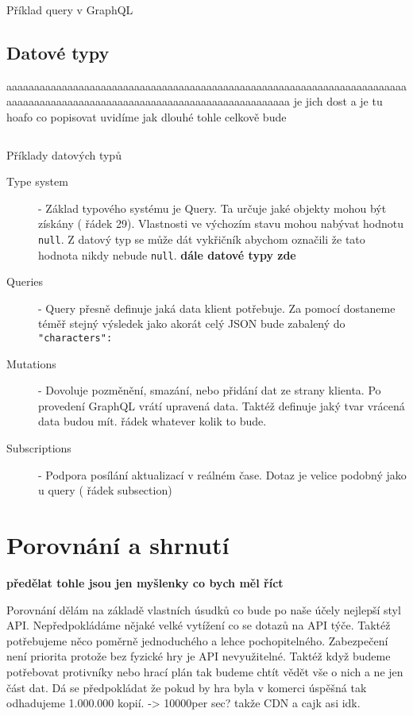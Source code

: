 \begin{listing}[ht!]
    \inputminted[]{graphql}{resources/code//standards/playerquery.gql}
    \caption{Příklad query v GraphQL}
    \label{code:gql_querry}
\end{listing}

\subsection{Datové typy}
aaaaaaaaaaaaaaaaaaaaaaaaaaaaaaaaaaaaaaaaaaaaaaaaaaaaaaaaaaaaaaaaaaaaaaaaaaaaaaaaaaaaaaaaaaaaaaaaaaaaaaaaaaaaaaaaaaaaaaaaaaa
je jich dost a je tu hoafo co popisovat uvidíme jak dlouhé tohle celkově bude


\begin{listing}[ht]
    \inputminted[]{graphql}{resources/code/standards/types.example.gql}
    \caption{Příklady datových typů}
    \label{code:gql_datatypes}
\end{listing}

\begin{description}
    \item[Type system] - Základ typového systému je Query. Ta určuje jaké objekty mohou být získány ( řádek 29). Vlastnosti ve výchozím stavu mohou nabývat hodnotu \texttt{null}. Z datový typ se může dát vykřičník abychom označili že tato hodnota nikdy nebude \texttt{null}. \textbf{dále datové typy zde}
    \item[Queries] - Query přesně definuje jaká data klient potřebuje. Za pomocí  dostaneme téměř stejný výsledek jako  akorát celý JSON bude zabalený do \texttt{"characters": {}}
    \item[Mutations] - Dovoluje pozměnění, smazání, nebo přidání dat ze strany klienta. Po provedení GraphQL vrátí upravená data. Taktéž definuje jaký tvar vrácená data budou mít.  řádek whatever kolik to bude.
    \item[Subscriptions] - Podpora posílání aktualizací v reálném čase. Dotaz je velice podobný jako u query ( řádek subsection)
\end{description}

\section{Porovnání a shrnutí} %
\textbf{předělat tohle jsou jen myšlenky co bych měl říct}

Porovnání dělám na základě vlastních úsudků co bude po naše účely nejlepší styl API. Nepředpokládáme nějaké velké vytížení co se dotazů na API týče. Taktéž potřebujeme něco poměrně jednoduchého a lehce pochopitelného. Zabezpečení není priorita protože bez fyzické hry je API nevyužitelné. Taktéž když budeme potřebovat protivníky nebo hrací plán tak budeme chtít vědět vše o nich a ne jen část dat. Dá se předpokládat že pokud by hra byla v komerci úspěšná tak odhadujeme 1.000.000 kopií. -> 10000per sec? takže CDN a cajk asi idk.


\endinput